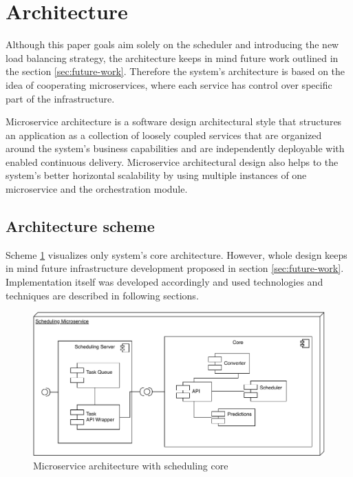 \section{Architecture}\label{sec:architecture}

Although this paper goals aim solely on the scheduler and introducing the new load balancing strategy,
the architecture keeps in mind future work outlined in the section \ref{sec:future-work}.
Therefore the system's architecture is based on the idea of cooperating microservices,
where each service has control over specific part of the infrastructure. 

Microservice architecture is a software design architectural style 
that structures an application as a collection of loosely coupled services that 
are organized around the system's business capabilities\cite{namiot2014micro} 
and are independently deployable with enabled continuous delivery\cite{balalaie2016microservices}.
Microservice architectural design also helps to the system's better horizontal scalability
by using multiple instances of one microservice 
and the orchestration module.

\subsection{Architecture scheme}\label{subsec:architecture-scheme}
Scheme \ref{fig:scheduling-core-arch} visualizes only system's core architecture. 
However,
whole design keeps in mind future infrastructure development proposed in section \ref{sec:future-work}.
Implementation itself was developed accordingly 
and used technologies and techniques are described in following sections.

\begin{figure}[h]
    \includegraphics[width=\textwidth]{i_scheduler.pdf} 
    \centering
    \caption{Microservice architecture with scheduling core}
    \label{fig:scheduling-core-arch}
\end{figure}

